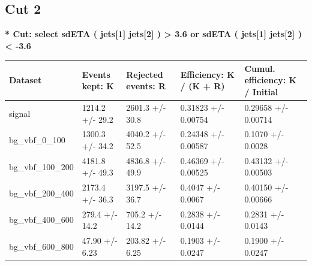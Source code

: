 \documentclass[a4paper, 10pt]{article}
\begin{document}
   \newpage
\subsection{Cut 2}

\textbf{* Cut: select sdETA ( jets[1] jets[2] ) > 3.6 or sdETA ( jets[1] jets[2] ) < -3.6}\\
   \begin{table}[H]
  \begin{center}
    \begin{tabular}{|m{20.0mm}|m{27.0mm}|m{27.0mm}|m{33.0mm}|m{32.0mm}|}
      \hline
      {\cellcolor{yellow}         Dataset}& {\cellcolor{yellow}         Events kept:
          K}& {\cellcolor{yellow}         Rejected events:
          R}& {\cellcolor{yellow}         Efficiency:
          K /\- (K + R)}& {\cellcolor{yellow}         Cumul. efficiency:
          K /\- Initial}\\
      \hline
      {\cellcolor{white}         signal}& {\cellcolor{white}         1214.2 +/\-- 29.2}& {\cellcolor{white}         2601.3 +/\-- 30.8}& {\cellcolor{white}         0.31823 +/\-- 0.00754}& {\cellcolor{white}         0.29658 +/\-- 0.00714}\\
      \hline
      {\cellcolor{white}         bg\_vbf\_0\_100}& {\cellcolor{white}         1300.3 +/\-- 34.2}& {\cellcolor{white}         4040.2 +/\-- 52.5}& {\cellcolor{white}         0.24348 +/\-- 0.00587}& {\cellcolor{white}         0.1070 +/\-- 0.0028}\\
      \hline
      {\cellcolor{white}         bg\_vbf\_100\_200}& {\cellcolor{white}         4181.8 +/\-- 49.3}& {\cellcolor{white}         4836.8 +/\-- 49.9}& {\cellcolor{white}         0.46369 +/\-- 0.00525}& {\cellcolor{white}         0.43132 +/\-- 0.00503}\\
      \hline
      {\cellcolor{white}         bg\_vbf\_200\_400}& {\cellcolor{white}         2173.4 +/\-- 36.3}& {\cellcolor{white}         3197.5 +/\-- 36.7}& {\cellcolor{white}         0.4047 +/\-- 0.0067}& {\cellcolor{white}         0.40150 +/\-- 0.00666}\\
      \hline
      {\cellcolor{white}         bg\_vbf\_400\_600}& {\cellcolor{white}         279.4 +/\-- 14.2}& {\cellcolor{white}         705.2 +/\-- 14.2}& {\cellcolor{white}         0.2838 +/\-- 0.0144}& {\cellcolor{white}         0.2831 +/\-- 0.0143}\\
      \hline
      {\cellcolor{white}         bg\_vbf\_600\_800}& {\cellcolor{white}         47.90 +/\-- 6.23}& {\cellcolor{white}         203.82 +/\-- 6.25}& {\cellcolor{white}         0.1903 +/\-- 0.0247}& {\cellcolor{white}         0.1900 +/\-- 0.0247}\\

\end{tabular}
\end{center}
\end{table}
\end{document}
